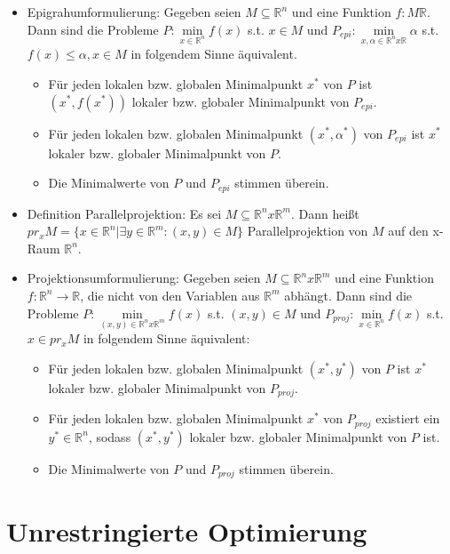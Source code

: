 \documentclass[paper=a4, fontsize=11pt]{scrartcl} %
\numberwithin{equation}{section} %
\numberwithin{figure}{section} %
\numberwithin{table}{section} %
\begin{document}
\begin{itemize}
\item Epigrahumformulierung: Gegeben seien $M \subseteq \mathbb{R}^n$ und eine Funktion $f: M \mathbb{R}$. Dann sind die Probleme $P: \min\limits_{x \in \mathbb{R}^n} f(x)$ s.t. $x \in M$ und $P_{epi}: \min\limits_{x,\alpha \in \mathbb{R}^n x \mathbb{R}} \alpha$ s.t. $f(x) \le \alpha, x \in M$ in folgendem Sinne äquivalent.
\begin{itemize}
\item Für jeden lokalen bzw. globalen Minimalpunkt $x^*$ von $P$ ist $(x^*,f(x^*))$ lokaler bzw. globaler Minimalpunkt von $P_{epi}$.
\item Für jeden lokalen bzw. globalen Minimalpunkt $(x^*,\alpha^*)$ von $P_{epi}$ ist $x^*$ lokaler bzw. globaler Minimalpunkt von $P$.
\item Die Minimalwerte von $P$ und $P_{epi}$ stimmen überein.
\end{itemize}
\item Definition Parallelprojektion: Es sei $M \subseteq \mathbb{R}^n x \mathbb{R}^m$. Dann heißt $pr_x M = \{ x \in \mathbb{R}^n | \exists y \in \mathbb{R}^m : (x,y) \in M \}$ Parallelprojektion von $M$ auf den \glqq x-Raum \grqq $\mathbb{R}^n$.
\item Projektionsumformulierung: Gegeben seien $M \subseteq \mathbb{R}^n x \mathbb{R}^m$ und eine Funktion $f: \mathbb{R}^n \rightarrow \mathbb{R}$, die nicht von den Variablen aus $\mathbb{R}^m$ abhängt. Dann sind die Probleme $P: \min\limits_{(x,y) \in \mathbb{R}^n x \mathbb{R}^m} f(x)$ s.t. $(x,y) \in M$ und $P_{proj}: \min\limits_{x \in \mathbb{R}^n} f(x)$ s.t. $x \in pr_x M$ in folgendem Sinne äquivalent:
\begin{itemize}
\item Für jeden lokalen bzw. globalen Minimalpunkt $(x^*,y^*)$ von $P$ ist $x^*$ lokaler bzw. globaler Minimalpunkt von $P_{proj}$.
\item Für jeden lokalen bzw. globalen Minimalpunkt $x^*$ von $P_{proj}$ existiert ein $y^* \in \mathbb{R}^n$, sodass $(x^*,y^*)$ lokaler bzw. globaler Minimalpunkt von $P$ ist.
\item Die Minimalwerte von $P$ und $P_{proj}$ stimmen überein.
\end{itemize}
\end{itemize}

\section{Unrestringierte Optimierung}
\end{document}
